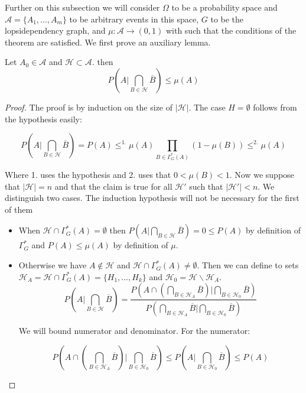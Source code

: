 Further on this subsection we will consider  $\Omega$ to be a probability space and $\mathcal{A} = \{A_1,...,A_m\}$ to be arbitrary events in this space, $G$ to be the lopsidependency graph, and $\mu: \mathcal{A} \to (0,1)$ with such that the conditions of the theorem are satisfied. We first prove an auxiliary lemma.

\begin{lemma} \label{LemaLLL}
Let $ A_0 \in \mathcal{A} $ and $\mathcal{H}\subset \mathcal{A} $. then 
\[
	P\left ( A \Big| \bigcap_{B\in \mathcal{H}} \overline{B}\right ) \le \mu(A) 
\]

		
\end{lemma}

\begin{proof}

The proof is by induction on the size of $|\mathcal{H}|$. The case $H=\emptyset$ follows from the hypothesis easily:

$$ 
	P\left ( A \Big| \bigcap_{B\in \mathcal{H}} \overline{B}\right ) =  P(A) \le^{1.}   \mu(A) \prod_{B\in\Gamma^*_G(A)} (1-\mu(B)) \le^{2.} \mu(A) $$

Where 1. uses the hypothesis and 2. uses that $0 < \mu(B) < 1$. Now we suppose that $|\mathcal{H}|=n$ and that the claim is true for all $\mathcal{H}'$ such that $|\mathcal{H}'|<n$. We distinguish two cases. The induction hypothesis will not be necessary for the first of them
\begin{itemize}
\item When $\mathcal{H} \cap \Gamma^*_G(A) = \emptyset$ then  $	P\left ( A \Big| \bigcap_{B\in \mathcal{H}} \overline{B}\right ) = 0 \le P(A)$ by definition of $\Gamma_G^*$ and $P(A) \le \mu(A)$ by definition of $\mu$.
\item Otherwise we have $A\not \in \mathcal{H}$ and $\mathcal{H} \cap \Gamma^*_G(A) \ne \emptyset$. Then we can define to sets $\mathcal{H}_A = \mathcal{H} \cap \Gamma^*_G(A) = \{H_1,...,H_k\}$ and $\mathcal{H}_0 = \mathcal{H}  \backslash \mathcal{H}_A$. 
\[
	P\left ( A \Big| \bigcap_{B\in \mathcal{H}} \overline{B} \right ) = \frac{P\left ( A \cap \left ( \bigcap_{B\in \mathcal{H}_A} \overline{B} \right ) \Big| \bigcap_{B\in \mathcal{H}_0} \overline{B} \right )
	}{P\left ( \bigcap_{B\in \mathcal{H}_A} \overline{B}  \Big| \bigcap_{B\in \mathcal{H}_0} \overline{B} \right )}
\]

We will bound numerator and denominator. For the numerator:

\[
P\left ( A \cap \left ( \bigcap_{B\in \mathcal{H}_A} \overline{B} \right ) \Big| \bigcap_{B\in \mathcal{H}_0} \overline{B} \right ) \le P\left ( A \Big| \bigcap_{B\in \mathcal{H}_0} \overline{B} \right ) \le P(A)
\]


\end{itemize}
\end{proof}
